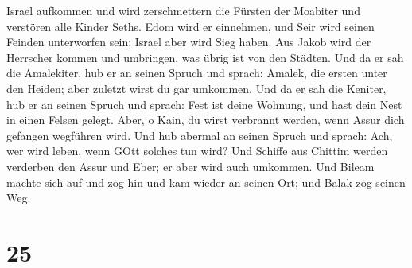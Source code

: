 Israel aufkommen und wird zerschmettern die Fürsten der Moabiter und
verstören alle Kinder Seths.  Edom wird er einnehmen, und
Seir wird seinen Feinden unterworfen sein; Israel aber wird Sieg haben.
 Aus Jakob wird der Herrscher kommen und umbringen, was
übrig ist von den Städten.  Und da er sah die Amalekiter,
hub er an seinen Spruch und sprach: Amalek, die ersten unter den Heiden;
aber zuletzt wirst du gar umkommen.  Und da er sah die
Keniter, hub er an seinen Spruch und sprach: Fest ist deine Wohnung, und
hast dein Nest in einen Felsen gelegt.  Aber, o Kain, du
wirst verbrannt werden, wenn Assur dich gefangen wegführen wird.
 Und hub abermal an seinen Spruch und sprach: Ach, wer wird
leben, wenn GOtt solches tun wird?  Und Schiffe aus Chittim
werden verderben den Assur und Eber; er aber wird auch umkommen.
 Und Bileam machte sich auf und zog hin und kam wieder an
seinen Ort; und Balak zog seinen Weg.

\hypertarget{section-24}{%
\section{25}\label{section-24}}

